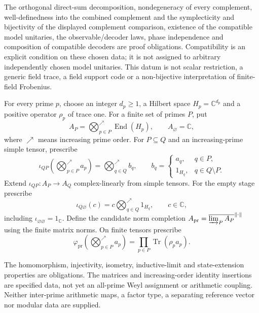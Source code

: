 \begin{scope}
The orthogonal direct-sum decomposition, nondegeneracy of every complement, well-definedness into the combined complement and the symplecticity and bijectivity of the displayed complement comparison, existence of the compatible model unitaries, the observable/decoder laws, phase independence and composition of compatible decoders are proof obligations. Compatibility is an explicit condition on these chosen data; it is not assigned to arbitrary independently chosen model unitaries. This datum is not scalar restriction, a generic field trace, a field support code or a non-bijective interpretation of finite-field Frobenius.
\end{scope}

\begin{definition}
For every prime $p$, choose an integer $d_p\geq1$, a Hilbert space
$H_p=\mathbb C^{d_p}$ and a positive operator $\rho_p$ of trace one.
For a finite set of primes $P$, put
\[
 A_P=\bigotimes_{p\in P}^{\nearrow}\operatorname{End}(H_p),
 \qquad A_\varnothing=\mathbb C,
\]
where $\nearrow$ means increasing prime order. For $P\subseteq Q$ and an
increasing-prime simple tensor, prescribe
\[
 \iota_{QP}\!\left(\bigotimes_{p\in P}^{\nearrow}a_p\right)
 =\bigotimes_{q\in Q}^{\nearrow}b_q,
 \qquad
 b_q=\begin{cases}
 a_q,&q\in P,\\
 1_{H_q},&q\in Q\setminus P.
 \end{cases}
\]
Extend $\iota_{QP}:A_P\to A_Q$ complex-linearly from simple tensors. For the
empty stage prescribe
\[
 \iota_{Q\varnothing}(c)
 =c\bigotimes_{q\in Q}^{\nearrow}1_{H_q},
 \qquad c\in\mathbb C,
\]
including $\iota_{\varnothing\varnothing}=1_{\mathbb C}$.
Define the candidate norm completion
$A_{\mathrm{pr}}=\overline{\varinjlim_P A_P}^{\|\cdot\|}$ using the finite
matrix norms. On finite tensors prescribe
\[
 \varphi_{\mathrm{pr}}\!\left(
 \bigotimes_{p\in P}^{\nearrow}a_p\right)
 =\prod_{p\in P}\operatorname{Tr}(\rho_pa_p).
\]
\end{definition}
\begin{scope}
The homomorphism, injectivity, isometry, inductive-limit and state-extension properties are obligations. The matrices and increasing-order identity insertions are specified data, not yet an all-prime Weyl assignment or arithmetic coupling. Neither inter-prime arithmetic maps, a factor type, a separating reference vector nor modular data are supplied.
\end{scope}

